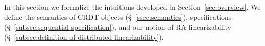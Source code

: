 \section{\CRDTLin{}}
\label{sec:distributed-lin}


In this section we formalize the intuitions developed in Section~\ref{sec:overview}. We define the semantics of CRDT objects (\S~\ref{ssec:semantics}), specifications (\S~\ref{subsec:sequential specification}), and our notion of RA-linearizability (\S~\ref{subsec:definition of distributed linearizability}).



